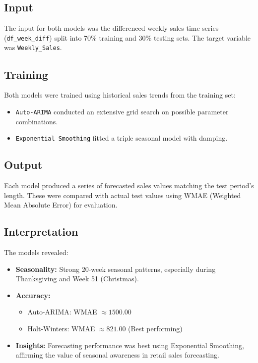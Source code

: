 \subsection{Input}

The input for both models was the differenced weekly sales time series (\texttt{df\_week\_diff}) split into 70\% training and 30\% testing sets. The target variable was \texttt{Weekly\_Sales}.

\subsection{Training}

Both models were trained using historical sales trends from the training set:

\begin{itemize}
	\item \texttt{Auto-ARIMA} conducted an extensive grid search on possible parameter combinations.
	\item \texttt{Exponential Smoothing} fitted a triple seasonal model with damping.
\end{itemize}

\subsection{Output}

Each model produced a series of forecasted sales values matching the test period's length. These were compared with actual test values using WMAE (Weighted Mean Absolute Error) for evaluation.

\subsection{Interpretation}

The models revealed:
\begin{itemize}
	\item \textbf{Seasonality:} Strong 20-week seasonal patterns, especially during Thanksgiving and Week 51 (Christmas).
	\item \textbf{Accuracy:} 
	\begin{itemize}
		\item Auto-ARIMA: WMAE $\approx 1500.00$
		\item Holt-Winters: WMAE $\approx 821.00$ (Best performing)
	\end{itemize}
	\item \textbf{Insights:} Forecasting performance was best using Exponential Smoothing, affirming the value of seasonal awareness in retail sales forecasting.
\end{itemize}

